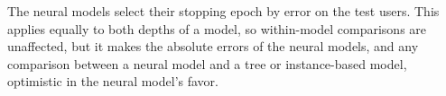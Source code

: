 The neural models select their stopping epoch by error on the test users. This applies equally to both depths of a model, so within-model comparisons are unaffected, but it makes the absolute errors of the neural models, and any comparison between a neural model and a tree or instance-based model, optimistic in the neural model's favor.
